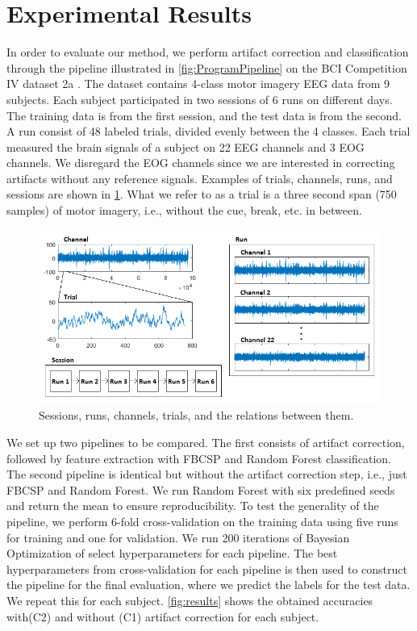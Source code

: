 \section{Experimental Results}\label{sec:results}
In order to evaluate our method, we perform artifact correction and classification through the pipeline illustrated in \cref{fig:ProgramPipeline} on the BCI Competition IV dataset 2a \citep{brunner2008bci}. The dataset contains 4-class motor imagery EEG data from 9 subjects. Each subject participated in two sessions of 6 runs on different days. The training data is from the first session, and the test data is from the second. A run consist of 48 labeled trials, divided evenly between the 4 classes. Each trial measured the brain signals of a subject on 22 EEG channels and 3 EOG channels. We disregard the EOG channels since we are interested in correcting artifacts without any reference signals. Examples of trials, channels, runs, and sessions are shown in \cref{fig:dataset}. What we refer to as a trial is a three second span (750 samples) of motor imagery, i.e., without the cue, break, etc. in between.

\begin{figure}
	\centering
	\begin{adjustbox}{width=\textwidth}
		\includegraphics{figures/bciiv2a.png}
	\end{adjustbox}
	\caption{Sessions, runs, channels, trials, and the relations between them.}
	\label{fig:dataset}
\end{figure}

We set up two pipelines to be compared. The first consists of artifact correction, followed by feature extraction with FBCSP and Random Forest classification. The second pipeline is identical but without the artifact correction step, i.e., just FBCSP and Random Forest. We run Random Forest with six predefined seeds and return the mean to ensure reproducibility.
To test the generality of the pipeline, we perform 6-fold cross-validation on the training data using five runs for training and one for validation. We run 200 iterations of Bayesian Optimization of select hyperparameters for each pipeline. The best hyperparameters from cross-validation for each pipeline is then used to construct the pipeline for the final evaluation, where we predict the labels for the test data. We repeat this for each subject. 
\cref{fig:results} shows the obtained accuracies with(C2) and without (C1) artifact correction for each subject.

